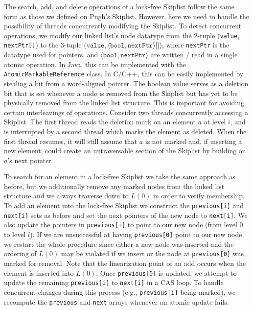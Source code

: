 \documentclass{acm_proc_article-sp}
\begin{document}
The search, add, and delete operations of a lock-free Skiplist follow the same form as
those we defined on Pugh's Skiplist.
However, here we need to handle the possibility of threads
concurrently modifying the Skiplist. To detect concurrent operations, we
modify our linked list's node datatype from the 2-tuple (\texttt{value}, \texttt{nextPtr[]}) to
the 3-tuple $(\texttt{value}, \allowbreak \langle \texttt{bool}, \allowbreak \texttt{nextPtr} \rangle\texttt{[]}$),
where \texttt{nextPtr} is the datatype used for pointers, and $\langle \texttt{bool}, \allowbreak \texttt{nextPtr} \rangle$
are written / read in a single atomic operation. In Java, this can be implemented
with the \texttt{AtomicMarkableReference} class.
In C/C++, this can be easily implemented by stealing a bit from a word-aligned pointer.
The boolean value serves as a deletion bit that is set whenever a node is removed
from the Skiplist but has yet to be physically removed from the linked list structure. This is
important for avoiding certain interleavings of operations. Consider two threads concurrently accessing
a Skiplist. The first thread reads the deletion mark on an element $a$ at level $i$, and is
interrupted by a second thread which marks the element as deleted. When the first thread resumes,
it will still assume that $a$ is not marked and, if inserting a new element,
could create an untraversable section of the
Skiplist by building on $a$'s next pointer.

To search for an element in a lock-free Skiplist we take the same approach as before, but
we additionally remove any marked nodes from the linked list structure and we always traverse
down to $L(0)$ in order to verify membership. To add an element
into the lock-free Skiplist we construct the \texttt{previous[i]} and \texttt{next[i]} sets
as before and set the next pointers of the new node to \texttt{next[i]}. We also update the
pointers in \texttt{previous[i]} to point to our new node (from level $0$ to level $l$).
If we are unsuccessful at having \texttt{previous[0]} point to our new node, we restart the
whole procedure since either a new node was inserted and the ordering of $L(0)$ may be violated
if we insert or the node at \texttt{previous[0]} was marked for removal.
Note that the linearization point of an add occurs when the element is inserted
into $L(0)$. Once \texttt{previous[0]} is updated, we attempt to update the remaining
\texttt{previous[i]} to \texttt{next[i]} in a CAS loop. To handle concurrent changes
during this process (e.g., \texttt{previous[i]} being marked), we recompute the \texttt{previous}
and \texttt{next} arrays whenever an atomic update fails.
\end{document}
